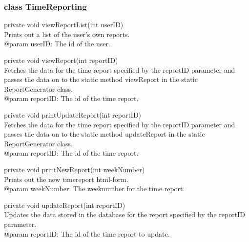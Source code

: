 \documentclass[a4paper]{article}
\begin{document}
\subsubsection{class TimeReporting}

\begin{hangparas}{1.5em}{1}
private void viewReportList(int userID)\\
Prints out a list of the user’s own reports. \\
@param userID: The id of the user.
\end{hangparas}

\vspace{5mm}
\begin{hangparas}{1.5em}{1}
private void viewReport(int reportID)\\
Fetches the data for the time report specified by the reportID parameter and passes the data on to the static method viewReport in the static ReportGenerator class.\\
@param reportID: The id of the time report.
\end{hangparas}

\vspace{5mm}
\begin{hangparas}{1.5em}{1}
private void printUpdateReport(int reportID)\\
Fetches the data for the time report specified by the reportID parameter and passes the data on to the static method updateReport in the static ReportGenerator class.\\
@param reportID: The id of the time report.
\end{hangparas}

\vspace{5mm}
\begin{hangparas}{1.5em}{1}
private void printNewReport(int weekNumber)\\
Prints out the new timereport html-form.\\
@param weekNumber: The weeknumber for the time report.
\end{hangparas}

\vspace{5mm}
\begin{hangparas}{1.5em}{1}
private void updateReport(int reportID)\\
Updates the data stored in the database for the report specified by the reportID parameter.\\
@param reportID: The id of the time report to update. 
\end{hangparas}
\end{document}

